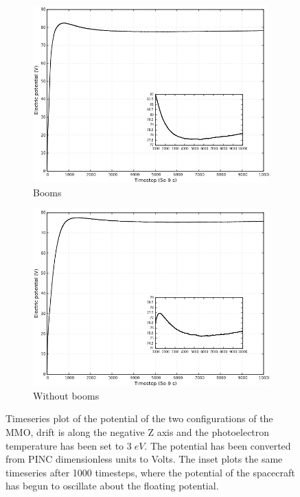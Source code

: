 \begin{figure}[H]
  \centering
  \begin{subfigure}[b]{0.75\textwidth}
  \includegraphics[width=\columnwidth]{figures/MMO/PHTemp/WB/C_PHTemp_WB.png}
  \caption{Booms}
  \label{fig:C_PHTemp_WB}
\end{subfigure}
\par\bigskip
\begin{subfigure}[b]{0.75\textwidth}
  \includegraphics[width=\columnwidth]{figures/MMO/PHTemp/NB/C_PHTemp_NB.png}
  \caption{Without booms}
  \label{fig:C_PHTemp_NB}
\end{subfigure}
\caption{Timeseries plot of the potential of the two configurations of the MMO, drift is along the negative Z axis and the photoelectron temperature has been set to $3 \; eV$. The potential has been converted from PINC dimensionless units to Volts. The inset plots the same timeseries after 1000 timesteps, where the potential of the spacecraft has begun to oscillate about the floating potential.}
\label{fig:Conv_PHTemp}
\end{figure}

